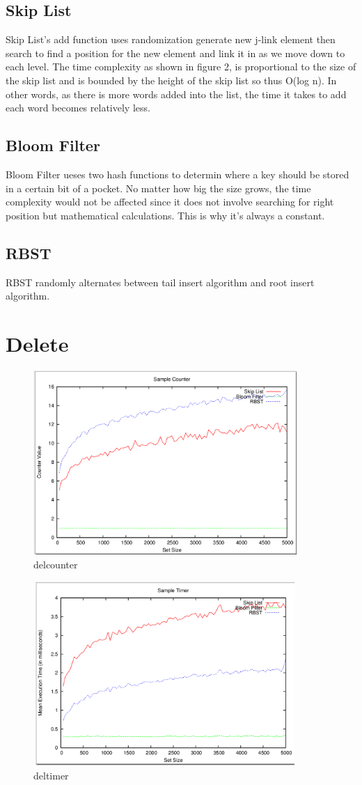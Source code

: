 \documentclass[11pt]{article}
\begin{document}
\subsection*{Skip List}
Skip List's add function uses randomization generate new j-link element then search to find a position for the new element and link it in as we move down to each level. The time complexity as shown in figure 2, is proportional to the size of the skip list and is bounded by the height of the skip list so thus O(log n). In other words, as there is more words added into the list, the time it takes to add each word becomes relatively less.
\subsection*{Bloom Filter}
Bloom Filter ueses two hash functions to determin where a key should be stored in a certain bit of a pocket. No matter how big the size grows, the time complexity would not be affected since it does not involve searching for right position but mathematical calculations. This is why it's always a constant. 
\subsection*{RBST}
RBST randomly alternates between tail insert algorithm and root insert algorithm. 
\section{Delete}
\begin{figure}[ht]
\centering
\includegraphics[height=70mm,width=100mm]{delcounter.png}
\caption{delcounter}
\end{figure}
\begin{figure}[ht]
\centering
\includegraphics[height=70mm,width=100mm]{deltimer.png}
\caption{deltimer}
\end{figure}
\end{document}
